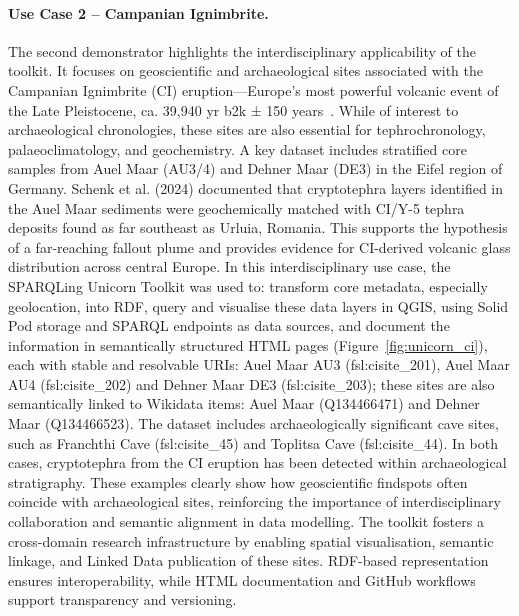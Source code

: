 \documentclass{eceasst}
\begin{document}
\paragraph{Use Case 2 – Campanian Ignimbrite.} The second demonstrator highlights the interdisciplinary applicability of the toolkit. It focuses on geoscientific and archaeological sites associated with the Campanian Ignimbrite (CI) eruption—Europe’s most powerful volcanic event of the Late Pleistocene, ca. 39,940 yr b2k ± 150 years~\cite{schenk_cryptotephra_2024}. While of interest to archaeological chronologies, these sites are also essential for tephrochronology, palaeoclimatology, and geochemistry. A key dataset includes stratified core samples from Auel Maar (AU3/4) and Dehner Maar (DE3) in the Eifel region of Germany. Schenk et al. (2024) documented that cryptotephra layers identified in the Auel Maar sediments were geochemically matched with CI/Y-5 tephra deposits found as far southeast as Urluia, Romania. This supports the hypothesis of a far-reaching fallout plume and provides evidence for CI-derived volcanic glass distribution across central Europe. In this interdisciplinary use case, the SPARQLing Unicorn Toolkit was used to: transform core metadata, especially geolocation, into RDF, query and visualise these data layers in QGIS, using Solid Pod storage and SPARQL endpoints as data sources, and document the information in semantically structured HTML pages (Figure~\ref{fig:unicorn_ci}), each with stable and resolvable URIs: Auel Maar AU3 (fsl:cisite\_201), Auel Maar AU4 (fsl:cisite\_202) and Dehner Maar DE3 (fsl:cisite\_203); these sites are also semantically linked to Wikidata items: Auel Maar (Q134466471) and Dehner Maar (Q134466523). The dataset includes archaeologically significant cave sites, such as Franchthi Cave (fsl:cisite\_45) and Toplitsa Cave (fsl:cisite\_44). In both cases, cryptotephra from the CI eruption has been detected within archaeological stratigraphy. These examples clearly show how geoscientific findspots often coincide with archaeological sites, reinforcing the importance of interdisciplinary collaboration and semantic alignment in data modelling. The toolkit fosters a cross-domain research infrastructure by enabling spatial visualisation, semantic linkage, and Linked Data publication of these sites. RDF-based representation ensures interoperability, while HTML documentation and GitHub workflows support transparency and versioning.
\end{document}
